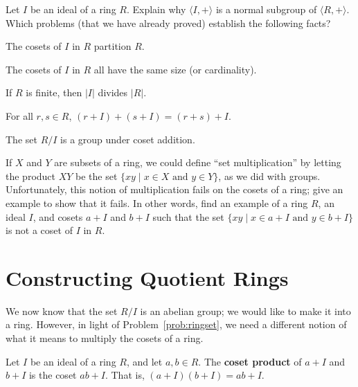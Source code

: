 \begin{problem}
Let \(I\) be an ideal of a ring \(R\). Explain why \(\langle I, +\rangle\) is a normal subgroup of \(\langle R, + \rangle \). Which problems (that we have already proved) establish the following facts?
\begin{problemparts}
  \item The cosets of \(I\) in \(R\) partition \(R\).
  \item The cosets of \(I\) in \(R\) all have the same size (or cardinality).
\begin{annotation}
\end{annotation}
  \item If \(R\) is finite, then \(\lvert I \rvert \) divides \(\lvert R \rvert\).
  \item For all \(r,s \in R\), \((r+I)+(s+I) = (r+s) + I\).
  \item The set \(R/I\) is a group under coset addition.
\end{problemparts}
\end{problem}

\begin{problem}\label{prob:ringset}
If \(X\) and \(Y\) are subsets of a ring, we could define ``set multiplication'' by letting the product \(XY\) be the set \(\{xy \mid x\in X \mbox{ and } y\in Y\}\), as we did with groups. Unfortunately, this notion of multiplication fails on the cosets of a ring; give an example to show that it fails. In other words, find an example of a ring \(R\), an ideal \(I\), and cosets \(a+I\) and \(b+I\) such that the set  \(\{xy \mid x\in a+I \mbox{ and } y\in b+I\}\) is not a coset of \(I\) in \(R\).
\end{problem}

\section{Constructing Quotient Rings}
We now know that the set \(R/I\) is an abelian group; we would like to make it into a ring. However, in light of Problem~\ref{prob:ringset}, we need a different notion of what it means to multiply the cosets of a ring.

\begin{definition}
Let \(I\) be an ideal of a ring \(R\), and let \(a,b \in R\). The \textbf{coset product} of \(a+I\) and \(b+I\) is the coset \(ab+I\). That is, \( (a+I)(b+I) = ab +I\).
\end{definition}

